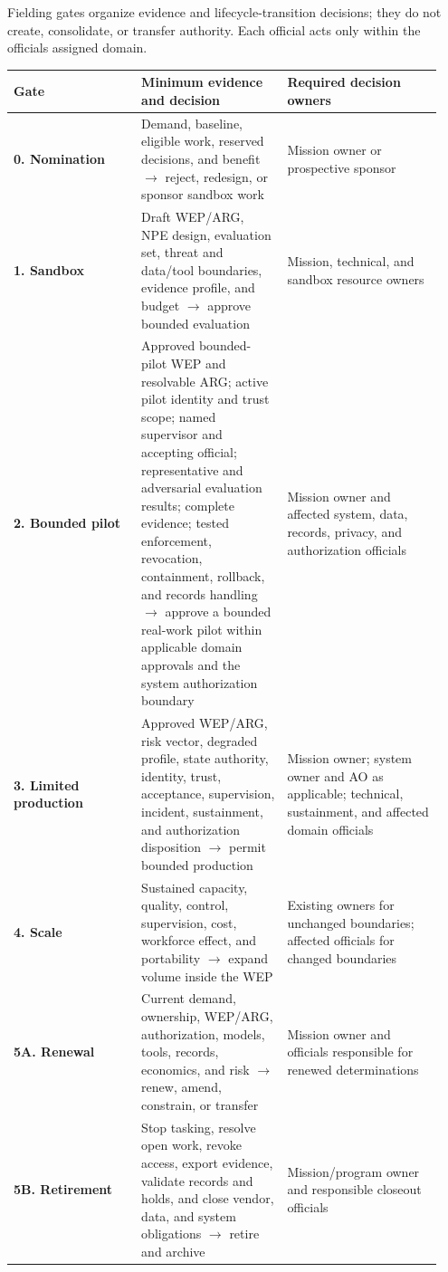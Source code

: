 \documentclass[11pt]{article}
\begin{document}
Fielding gates organize evidence and lifecycle-transition decisions;
they do not create, consolidate, or transfer authority. Each official
acts only within the official\textquotesingle s assigned domain.

\begingroup\footnotesize\setlength{\tabcolsep}{3pt}\begin{longtable}{p{0.28\linewidth}p{0.32\linewidth}p{0.34\linewidth}}
\toprule\noalign{}
Gate & Minimum evidence and decision & Required decision owners \\
\midrule\noalign{}
\endhead
\bottomrule\noalign{}
\endlastfoot
\textbf{0. Nomination} & Demand, baseline, eligible work, reserved
decisions, and benefit \ensuremath{\rightarrow} reject, redesign, or sponsor sandbox work &
Mission owner or prospective sponsor \\
\textbf{1. Sandbox} & Draft WEP/ARG, NPE design, evaluation set, threat
and data/tool boundaries, evidence profile, and budget \ensuremath{\rightarrow} approve bounded
evaluation & Mission, technical, and sandbox resource owners \\
\textbf{2. Bounded pilot} & Approved bounded-pilot WEP and resolvable
ARG; active pilot identity and trust scope; named supervisor and
accepting official; representative and adversarial evaluation results;
complete evidence; tested enforcement, revocation, containment,
rollback, and records handling \ensuremath{\rightarrow} approve a bounded real-work pilot
within applicable domain approvals and the system authorization boundary
& Mission owner and affected system, data, records, privacy, and
authorization officials \\
\textbf{3. Limited production} & Approved WEP/ARG, risk vector, degraded
profile, state authority, identity, trust, acceptance, supervision,
incident, sustainment, and authorization disposition \ensuremath{\rightarrow} permit bounded
production & Mission owner; system owner and AO as applicable;
technical, sustainment, and affected domain officials \\
\textbf{4. Scale} & Sustained capacity, quality, control, supervision,
cost, workforce effect, and portability \ensuremath{\rightarrow} expand volume inside the WEP &
Existing owners for unchanged boundaries; affected officials for changed
boundaries \\
\textbf{5A. Renewal} & Current demand, ownership, WEP/ARG,
authorization, models, tools, records, economics, and risk \ensuremath{\rightarrow} renew,
amend, constrain, or transfer & Mission owner and officials responsible
for renewed determinations \\
\textbf{5B. Retirement} & Stop tasking, resolve open work, revoke
access, export evidence, validate records and holds, and close vendor,
data, and system obligations \ensuremath{\rightarrow} retire and archive & Mission/program
owner and responsible closeout officials \\
\end{longtable}\endgroup
\end{document}
